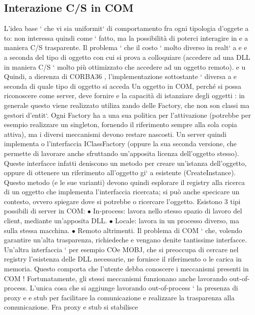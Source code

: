\documentclass[a4paper,12pt]{article}
\begin{document}
\subsection{Interazione C/S in COM}
L'idea base ` che vi sia uniformit` di comportamento fra ogni tipologia d'oggete
a
to: non interessa quindi come ` fatto, ma la possibilità di poterci interagire in
e
a
maniera C/S trasparente. Il problema ` che il costo ` molto diverso in realt` a
e
e
a
seconda del tipo di oggetto con cui si prova a colloquiare (accedere ad una DLL
in maniera C/S ` molto più ottimizzato che accedere ad un oggetto remoto).
e
u
Quindi, a dierenza di CORBA36 , l'implementazione sottostante ` diversa a
e
seconda di quale tipo di oggetto si acceda
Un oggetto in COM, perché si possa riconoscere come server, deve fornire
e
la capacità di istanziare degli oggetti : in generale questo viene realizzato utiliza
zando delle Factory, che non son classi ma gestori d'entit`. Ogni Factory ha
a
una sua politica per l'attivazione (potrebbe per esempio realizzare un singleton,
fornendo il riferimento sempre alla sola copia attiva), ma i diversi meccanismi
devono restare nascosti.
Un server quindi implementa o l'interfaccia IClassFactory (oppure la sua
seconda versione, che permette di lavorare anche sfruttando un'apposita licenza dell'oggetto stesso). Queste interfacce
infatti deniscono un metodo per
creare un'istanza dell'oggetto, oppure di ottenere un riferimento all'oggetto gi`
a
esistente (CreateInstance). Questo metodo (e le sue varianti) devono quindi
esplorare il registry alla ricerca di un oggetto che implementa l'interfaccia ricercata; si può anche specicare un
contesto, ovvero spiegare dove si potrebbe
o
ricercare l'oggetto.
Esistono 3 tipi possibili di server in COM:
$\bullet$ In-process: lavora nello stesso spazio di lavoro del client, mediante un'apposita DLL.
$\bullet$ Locale: lavora in un processo diverso, ma sulla stessa macchina.
$\bullet$ Remoto altrimenti.
Il problema di COM ` che, volendo garantire un'alta trasparenza, richiedeche
e
vengano denite tantissime interfacce. Un'altra interfaccia ` per esempio COe
MOBJ, che si preoccupa di cercare nel registry l'esistenza delle DLL necessarie,
ne fornisce il riferimento o le carica in memoria. Questo comporta che l'utente debba conoscere i meccanismi presenti in
COM ! Fortunatamente, gli stessi
meccanismi funzionano anche lavorando out-of-process.
L'unica cosa che si aggiunge lavorando out-of-process ` la presenza di proxy
e
e stub per facilitare la comunicazione e realizzare la trasparenza alla comunicazione. Fra proxy e stub si stabilisce
\end{document}
